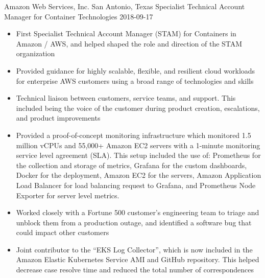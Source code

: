 \roleheader
    {Amazon Web Services, Inc.}
    {San Antonio, Texas}
    {Specialist Technical Account Manager for Container Technologies}
    {2018-09-17}
    {}

\begin{itemize}

    \item First Specialist Technical Account Manager (STAM) for Containers in Amazon / AWS, and helped shaped the role and direction of the STAM organization

    \item Provided guidance for highly scalable, flexible, and resilient cloud workloads for enterprise AWS customers using a broad range of technologies and skills

    \item Technical liaison between customers, service teams, and support. This included being the voice of the customer during product creation, escalations, and product improvements

    \item Provided a proof-of-concept monitoring infrastructure which monitored 1.5 million vCPUs and 55,000+ Amazon EC2 servers with a 1-minute monitoring service level agreement (SLA). This setup included the use of: Prometheus for the collection and storage of metrics, Grafana for the custom dashboards, Docker for the deployment, Amazon EC2 for the servers, Amazon Application Load Balancer for load balancing request to Grafana, and Prometheus Node Exporter for server level metrics.

    \item Worked closely with a Fortune 500 customer's engineering team to triage and unblock them from a production outage, and identified a software bug that could impact other customers

    \item Joint contributor to the ``EKS Log Collector'', which is now included in the Amazon Elastic Kubernetes Service AMI and GitHub repository. This helped decrease case resolve time and reduced the total number of correspondences

\end{itemize}